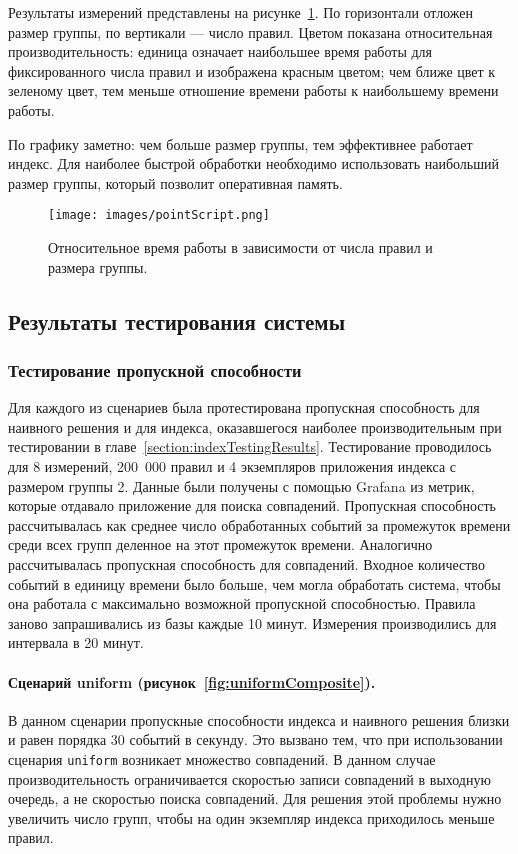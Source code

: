 \documentclass[14pt]{article}
\begin{document}
Результаты измерений представлены на рисунке~\ref{fig:pointScript}. По горизонтали отложен размер группы, по вертикали --- число правил. Цветом показана относительная производительность: единица означает наибольшее время работы для фиксированного числа правил и изображена красным цветом; чем ближе цвет к зеленому цвет, тем меньше отношение времени работы к наибольшему времени работы.

По графику заметно: чем больше размер группы, тем эффективнее работает индекс. Для наиболее быстрой обработки необходимо использовать наибольший размер группы, который позволит оперативная память.

\begin{figure}[h!]
    \centering
    \texttt{[image: images/pointScript.png]}
    \caption{Относительное время работы в зависимости от числа правил и размера группы.}
    \label{fig:pointScript}
\end{figure}

\subsection{Результаты тестирования системы}
\subsubsection{Тестирование пропускной способности}
Для каждого из сценариев была протестирована пропускная способность для наивного решения и для индекса, оказавшегося наиболее производительным при тестировании в главе~\ref{section:indexTestingResults}. Тестирование проводилось для 8 измерений, 200~000 правил и 4 экземпляров приложения индекса с размером группы 2. Данные были получены с помощью Grafana из метрик, которые отдавало приложение для поиска совпадений. Пропускная способность рассчитывалась как среднее число обработанных событий за промежуток времени среди всех групп деленное на этот промежуток времени. Аналогично рассчитывалась пропускная способность для совпадений. Входное количество событий в единицу времени было больше, чем могла обработать система, чтобы она работала с максимально возможной пропускной способностью. Правила заново запрашивались из базы каждые 10 минут. Измерения производились для интервала в 20 минут.

\paragraph{Сценарий uniform (рисунок~\ref{fig:uniformComposite}).} В данном сценарии пропускные способности индекса и наивного решения близки и равен порядка 30 событий в секунду. Это вызвано тем, что при использовании сценария \verb|uniform| возникает множество совпадений. В данном случае производительность ограничивается скоростью записи совпадений в выходную очередь, а не скоростью поиска совпадений. Для решения этой проблемы нужно увеличить число групп, чтобы на один экземпляр индекса приходилось меньше правил.
\end{document}
